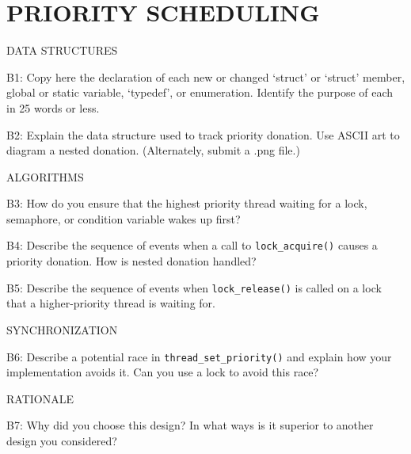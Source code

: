 \section{PRIORITY SCHEDULING}
\begin{aspect}{DATA STRUCTURES}
  \begin{qc}
    B1: Copy here the declaration of each new or changed `struct' or `struct' member, global or static variable, `typedef', or enumeration.  Identify the purpose of each in 25 words or less.
  \end{qc}
  \begin{qc}
    B2: Explain the data structure used to track priority donation.
    Use ASCII art to diagram a nested donation.  (Alternately, submit a
    .png file.)
  \end{qc}
\end{aspect}

\begin{aspect}{ALGORITHMS}
  \begin{qc}
    B3: How do you ensure that the highest priority thread waiting for a lock, semaphore, or condition variable wakes up first?
  \end{qc}

  \begin{qc}
    B4: Describe the sequence of events when a call to \lstinline{lock_acquire()} causes a priority donation.  How is nested donation handled?
  \end{qc}

  \begin{qc}
    B5: Describe the sequence of events when \lstinline{lock_release()} is called on a lock that a higher-priority thread is waiting for.
  \end{qc}

\end{aspect}

\begin{aspect}{SYNCHRONIZATION}

  \begin{qc}
    B6: Describe a potential race in \lstinline{thread_set_priority()} and explain how your implementation avoids it.  Can you use a lock to avoid this race?
  \end{qc}

\end{aspect}

\begin{aspect}{RATIONALE}
  \begin{qc}
    B7: Why did you choose this design?  In what ways is it superior to another design you considered?
  \end{qc}

\end{aspect}